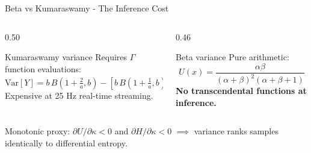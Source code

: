 \documentclass[aspectratio=169]{beamer}
\newcommand{\hl}[1]{\textcolor{coolpurple}{\textbf{#1}}}
\begin{document}
	\begin{frame}{Beta vs Kumaraswamy - The Inference Cost}
		\begin{columns}[onlytextwidth]
			\begin{column}{0.50\textwidth}
				\begin{alertblock}{Kumaraswamy variance}
					\small
					Requires $\Gamma$ function evaluations:
					$$ \text{Var}[Y] = b\,B\!\left(1{+}\tfrac{2}{a},b\right) - \left[b\,B\!\left(1{+}\tfrac{1}{a},b\right)\right]^2 $$
					Expensive at 25 Hz real-time streaming.
				\end{alertblock}
			\end{column}
			\begin{column}{0.46\textwidth}
				\begin{block}{Beta variance}
					\small
					Pure arithmetic:
					$$ U(x) = \frac{\alpha\beta}{(\alpha{+}\beta)^2(\alpha{+}\beta{+}1)} $$
					\hl{No transcendental functions at inference.}
				\end{block}
			\end{column}
		\end{columns}
		\vspace{0.5em}
		\centering\small
		Monotonic proxy: $\partial U/\partial\kappa < 0$ and $\partial H/\partial\kappa < 0$ $\implies$ variance ranks samples identically to differential entropy.
	\end{frame}
\end{document}
